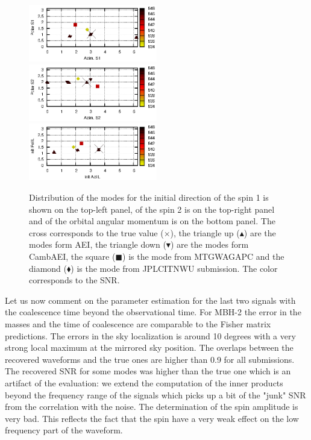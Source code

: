 \documentclass{iopart}
\begin{document}
\begin{figure}
\includegraphics[width=0.5\textwidth, clip=true, viewport=0 4 198 83 ]{DirS1_srcMC2_SNR.eps}
\includegraphics[width=0.5\textwidth, clip=true, viewport=0 4 198 83 ]{DirS2_srcMC2_SNR.eps}\\
\center \includegraphics[width=0.5\textwidth, clip=true, viewport=0 4 198 83 ]{DirL_srcMC2_SNR.eps}
\caption{Distribution of the modes for the initial direction of the spin 1 is shown on the top-left panel, of the spin 2
is on the top-right panel and of the orbital angular  momentum is on the bottom panel. The cross corresponds to the true value ($\times$), the triangle up ($\blacktriangle$) are the modes form AEI, the triangle down ($\blacktriangledown$) are the modes form CambAEI, the square ($\blacksquare$) is the mode from MTGWAGAPC and the diamond ($\blacklozenge$) is the mode from JPLCITNWU submission. The color corresponds to the SNR.
\label{fig:SMBH_spinLdeg}}
\end{figure}


Let us now comment on the parameter estimation for the last two signals with the coalescence time beyond the observational time. For MBH-2 the error in the masses and the time of coalescence are comparable to the Fisher matrix predictions. 
The errors in the sky localization is around 10 degrees with a very strong local maximum at the mirrored 
sky position. The overlaps between the recovered waveforms and the true ones are higher than 0.9 for all submissions.
The recovered SNR for some modes was higher than the true one which is an artifact of the evaluation: 
we extend the computation of the inner products beyond the frequency range of the signals which picks up a bit of the 
"junk" SNR from the correlation with the noise. 
%
The determination of the spin amplitude is very bad. This reflects the fact that the spin have a very weak effect on the low frequency part of the waveform. 
\end{document}

